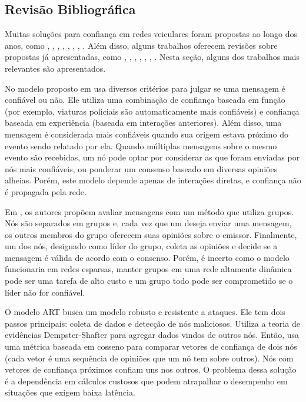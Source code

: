 \begin{resumoextendido}
	\section*{Revisão Bibliográfica}
	
	Muitas soluções para confiança em redes veiculares foram propostas ao longo dos anos, como \citep{patwardhan2006data}, \citep{gerlach2007trust}, \citep{raya2008data}, \citep{huang2010situation}, \citep{ding2013novel}, \citep{haddadou2013trust}, \citep{liu2016lsot}, \citep{kerrache2016detection}.
	Além disso, alguns trabalhos oferecem revisões sobre propostas já apresentadas, como \citep{zhang2011survey}, \citep{ma2011survey}, \citep{zhang2012trust}, \cite{mejri2014survey}, \citep{soleymani2015trust}, \citep{sengar2016survey}, \citep{dwivedi2016review}.
	Nesta seção, alguns dos trabalhos mais relevantes são apresentados.
	
	No modelo proposto em \citep{minhas2010towards} usa diversos critérios para julgar se uma mensagem é confiável ou não.
	Ele utiliza uma combinação de confiança baseada em função (por exemplo, viaturas policiais são automaticamente mais confiáveis) e confiança baseada em experiência (baseada em interações anteriores).
	Além disso, uma mensagem é considerada mais confiáveis quando sua origem estava próximo do evento sendo relatado por ela.
	Quando múltiplas mensagens sobre o mesmo evento são recebidas, um nó pode optar por considerar as que foram enviadas por nós mais confiáveis, ou ponderar um consenso baseado em diversas opiniões alheias.
	Porém, este modelo depende apenas de interações diretas, e confiança não é propagada pela rede.
	
	Em \citep{chen2010trust}, os autores propõem avaliar mensagens com um método que utiliza grupos.
	Nós são separados em grupos e, cada vez que um deseja enviar uma mensagem, os outros membros do grupo oferecem suas opiniões sobre o emissor.
	Finalmente, um dos nós, designado como líder do grupo, coleta as opiniões e decide se a mensagem é válida de acordo com o consenso.
	Porém, é incerto como o modelo funcionaria em redes esparsas, manter grupos em uma rede altamente dinâmica pode ser uma tarefa de alto custo e um grupo todo pode ser comprometido se o líder não for confiável.
		
	O modelo ART \citep{li2016art} busca um modelo robusto e resistente a ataques.
	Ele tem dois passos principais: coleta de dados e detecção de nós maliciosos.
	Utiliza a teoria de evidências Dempster-Shafter para agregar dados vindos de outros nós.
	Então, usa uma métrica baseada em cosseno para comparar vetores de confiança de dois nós (cada vetor é uma sequência de opiniões que um nó tem sobre outros).
	Nós com vetores de confiança próximos confiam uns nos outros.
	O problema dessa solução é a dependência em cálculos custosos que podem atrapalhar o desempenho em situações que exigem baixa latência.
	

\end{resumoextendido}
